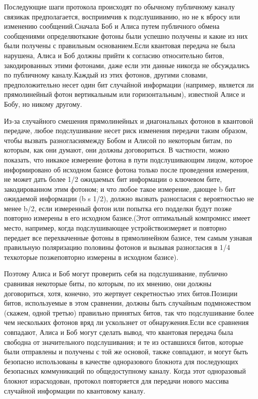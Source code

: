 ­­­­­Последующие шаги протокола происходят по обычному публичному каналу связикак предполагается, восприимчив к подслушиванию, но не к вбросу или изменению сообщений.Сначала Боб и Алиса путем публичного обмена сообщениями определяюткакие фотоны были успешно получены и какие из них были получены с правильным основанием.Если квантовая передача не была нарушена, Алиса и Боб должны прийти к согласию относительно битов, закодированных этими фотонами, даже если эти данные никогда не обсуждались по публичному каналу.Каждый из этих фотонов, другими словами, предположительно несет один бит случайной информации (например, является ли прямолинейный фотон вертикальным или горизонтальным), известной Алисе и Бобу, но никому другому.

­­­Из-за случайного смешения прямолинейных и диагональных фотонов в квантовой передаче, любое подслушивание несет риск изменения передачи таким образом, чтобы вызвать разногласиямежду Бобом и Алисой по некоторым битам, по которым, как они думают, они должны договориться. В частности, можно показать, что никакое измерение фотона в пути подслушивающим лицом, которое информировано об исходном базисе фотона только после проведения измерения, не может дать более 1/2 ожидаемых бит информации о ключевом бите, закодированном этим фотоном; и что любое такое измерение, дающее b бит ожидаемой информации (b s 1/2), должно вызвать разногласия с вероятностью не менее b/2, если измеренный фотон или попытка его подделки будут позже повторно измерены в его исходном базисе.(Этот оптимальный компромисс имеет место, например, когда подслушивающее устройствоизмеряет и повторно передает все перехваченные фотоны в прямолинейном базисе, тем самым узнавая правильную поляризацию половины фотонов и вызывая разногласия в 1/4 техкоторые позжеповторно измерены в исходном базисе).

­­­Поэтому Алиса и Боб могут проверить себя на подслушивание, публично сравнивая некоторые биты, по которым, по их мнению, они должны договориться, хотя, конечно, это жертвует секретностью этих битов.Позиции битов, используемые в этом сравнении, должны быть случайным подмножеством (скажем, одной третью) правильно принятых битов, так что подслушивание более чем нескольких фотонов вряд ли ускользнет от обнаружения.Если все сравнения совпадают, Алиса и Боб могут сделать вывод, что квантовая передача была свободна от значительного подслушивания; и те из оставшихся битов, которые были отправлены и получены с той же основой, также совпадают, и могут быть безопасно использованы в качестве одноразового блокнота для последующих безопасных коммуникаций по общедоступному каналу. Когда этот одноразовый блокнот израсходован, протокол повторяется для передачи нового массива случайной информации по квантовому каналу.

